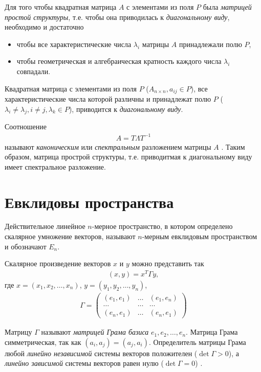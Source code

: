 \documentclass[%
	11pt,
	a4paper,
	utf8,
		]{article}
\begin{document}
Для того чтобы квадратная матрица $ A $ с элементами из поля $ P $ была \emph{матрицей простой структуры}, т.е. чтобы она приводилась к \emph{диагональному виду}, необходимо и достаточно \cite[]{shevtsov:linal-2012}
\begin{itemize}
	\item чтобы все характеристические числа $ \lambda_i $ матрицы $ A $ принадлежали полю $ P $,
	
	\item чтобы геометрическая и алгебраическая кратность каждого числа $ \lambda_i $ совпадали.
\end{itemize}

Квадратная матрица с элементами из поля $ P $ ($ A_{n \times n}, a_{ij} \in P $), все характеристические числа которой различны и принадлежат полю $ P $ ($ \lambda_i \neq \lambda_j, i \neq j, \lambda_k \in P $), приводится к \emph{диагональному виду}.

Соотношение 
\begin{align*}
	A = T \Lambda T^{-1}
\end{align*}
называют \emph{каноническим} или \emph{спектральным} разложением матрицы $ A $ \cite[]{shevtsov:linal-2012}. Таким образом, матрица прострой структуры, т.е. приводитмая к диагональному виду имеет спектральное разложение.

\section{Евклидовы пространства}

Действительное линейное $ n $-мерное пространство, в котором определено скалярное умножение векторов, называют $ n $-мерным евклидовым пространством и обозначают $ E_n $.

Скалярное произведение векторов $ x $ и $ y $ можно представить так
\begin{align*}
	(x, y) = x^T \Gamma y,
\end{align*}
где $ x = (x_1, x_2, \ldots, x_n) $, $ y = (y_1, y_2, \ldots, y_n) $,
\begin{align*}
	\Gamma = \begin{pmatrix}
		(e_1, e_1) & \ldots & (e_1, e_n) \\
		\ldots & \ldots & \ldots \\
		(e_n, e_1) & \ldots & (e_n, e_1)
	\end{pmatrix}
\end{align*}

Матрицу $ \Gamma $ называют \emph{матрицей Грама базиса} $ e_1, e_2, \ldots, e_n $. Матрица Грама симметрическая, так как $ (a_i, a_j) = (a_j, a_i) $. Определитель матрицы Грама любой \emph{линейно независимой} системы векторов положителен ($ \det \Gamma > 0$), а \emph{линейно зависимой} системы векторов равен нулю ($ \det \Gamma = 0 $) \cite[]{shevtsov:linal-2012}.
\end{document}

